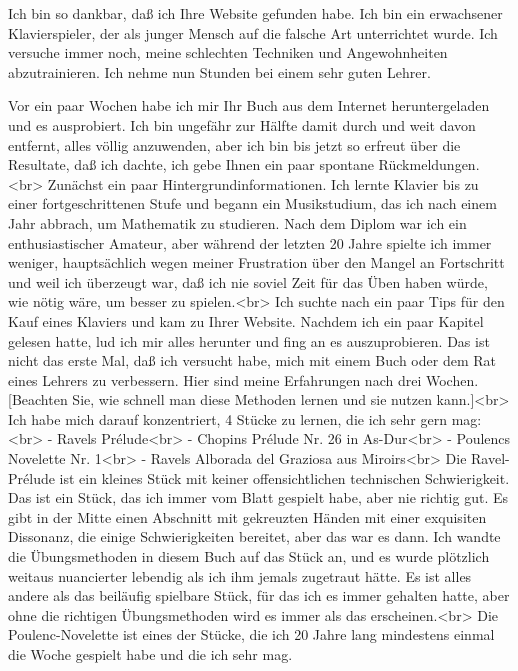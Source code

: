\item \hypertarget{testimonials08}{}
Ich bin so dankbar, daß ich Ihre Website gefunden habe.
Ich bin ein erwachsener Klavierspieler, der als junger Mensch auf die falsche Art unterrichtet wurde.
Ich versuche immer noch, meine schlechten Techniken und Angewohnheiten abzutrainieren.
Ich nehme nun Stunden bei einem sehr guten Lehrer.


\item \hypertarget{testimonials09}{}
Vor ein paar Wochen habe ich mir Ihr Buch aus dem Internet heruntergeladen und es ausprobiert.
Ich bin ungefähr zur Hälfte damit durch und weit davon entfernt, alles völlig anzuwenden, aber ich bin bis jetzt so erfreut über die Resultate, daß ich dachte, ich gebe Ihnen ein paar spontane Rückmeldungen.<br>
Zunächst ein paar Hintergrundinformationen.
Ich lernte Klavier bis zu einer fortgeschrittenen Stufe und begann ein Musikstudium, das ich nach einem Jahr abbrach, um Mathematik zu studieren.
Nach dem Diplom war ich ein enthusiastischer Amateur, aber während der letzten 20 Jahre spielte ich immer weniger, hauptsächlich wegen meiner Frustration über den Mangel an Fortschritt und weil ich überzeugt war, daß ich nie soviel Zeit für das Üben haben würde, wie nötig wäre, um besser zu spielen.<br>
Ich suchte nach ein paar Tips für den Kauf eines Klaviers und kam zu Ihrer Website.
Nachdem ich ein paar Kapitel gelesen hatte, lud ich mir alles herunter und fing an es auszuprobieren.
Das ist nicht das erste Mal, daß ich versucht habe, mich mit einem Buch oder dem Rat eines Lehrers zu verbessern.
Hier sind meine Erfahrungen nach drei Wochen.
[Beachten Sie, wie schnell man diese Methoden lernen und sie nutzen kann.]<br>
Ich habe mich darauf konzentriert, 4 Stücke zu lernen, die ich sehr gern mag:<br>
- Ravels Prélude<br>
- Chopins Prélude Nr. 26 in As-Dur<br>
- Poulencs Novelette Nr. 1<br>
- Ravels Alborada del Graziosa aus Miroirs<br>
Die Ravel-Prélude ist ein kleines Stück mit keiner offensichtlichen technischen Schwierigkeit.
Das ist ein Stück, das ich immer vom Blatt gespielt habe, aber nie richtig gut.
Es gibt in der Mitte einen Abschnitt mit gekreuzten Händen mit einer exquisiten Dissonanz, die einige Schwierigkeiten bereitet, aber das war es dann.
Ich wandte die Übungsmethoden in diesem Buch auf das Stück an, und es wurde plötzlich weitaus nuancierter lebendig als ich ihm jemals zugetraut hätte.
Es ist alles andere als das beiläufig spielbare Stück, für das ich es immer gehalten hatte, aber ohne die richtigen Übungsmethoden wird es immer als das erscheinen.<br>
Die Poulenc-Novelette ist eines der Stücke, die ich 20 Jahre lang mindestens einmal die Woche gespielt habe und die ich sehr mag.
